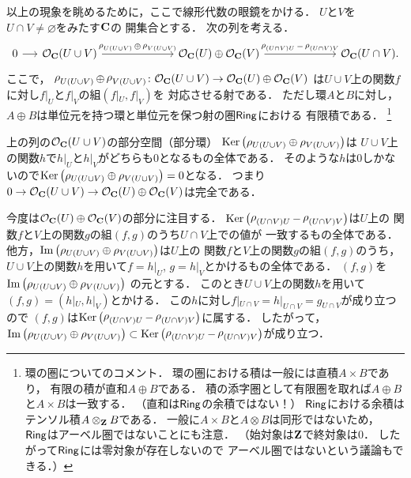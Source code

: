以上の現象を眺めるために，ここで線形代数の眼鏡をかける．
$U$と$V$を$U\cap V\neq\varnothing$をみたす$\mathbf{C}$の
開集合とする．
次の列を考える．
\begin{equation}\label{eq:hol-seq}
    \begin{tikzcd}%
        0 
        \arrow[r] 
        &[-0.03\linewidth]
        \OO_{\cc}(U\cup V)
        \arrow[r,"\res_{U(U\cup V)}\oplus\res_{V(U\cup V)}"]
        &[0.12\linewidth]
        \OO_{\cc}(U)\oplus\OO_{\cc}(V)
        \arrow[r, "\res_{(U\cap V)U}-\res_{(U\cap V)V}"] 
        &[0.12\linewidth]
        \OO_{\cc}(U\cap V).
    \end{tikzcd}
\end{equation}
ここで，
$\mathop{\rho}\nolimits_{U(U\cup V)}\oplus\mathop{\rho}\nolimits_{V(U\cup V)}\colon\mathcal{O}_{\mathbf{C}}(U\cup V)\to\mathcal{O}_{\mathbf{C}}(U)\oplus\mathcal{O}_{\mathbf{C}}(V)$
は$U\cup V$上の関数$f$に対し$f|_U$と$f|_V$の組$(f|_U,f|_V)$を
対応させる射である．
ただし環$A$と$B$に対し，
$A\oplus B$は単位元を持つ環と単位元を保つ射の圏$\mathop{\textsf{Ring}}\nolimits$における
有限積である．
\footnote{環の圏についてのコメント．
環の圏における積は一般には直積$A\times B$であり，
有限の積が直和$A\oplus B$である．
積の添字圏として有限圏を取れば$A\oplus B$と$A\times B$は一致する．
（直和は$\mathop{\textsf{Ring}}\nolimits$の余積ではない！）
$\mathop{\textsf{Ring}}\nolimits$における余積はテンソル積$A\otimes_{\mathbf{Z}} B$である．
一般に$A\times B$と$A\otimes B$は同形ではないため，
$\mathop{\textsf{Ring}}\nolimits$はアーベル圏ではないことにも注意．
（始対象は$\mathbf{Z}$で終対象は$0$．
したがって$\mathop{\textsf{Ring}}\nolimits$には零対象が存在しないので
アーベル圏ではないという議論もできる．）
}

上の列の$\mathcal{O}_{\mathbf{C}}(U\cup V)$の部分空間（部分環）
$\mathop{\mathrm{Ker}}\nolimits \left(\rho_{U(U\cup V)}\oplus\rho_{V(U\cup V)}\right)$は
$U\cup V$上の関数$h$で$h|_U$と$h|_V$がどちらも$0$となるもの全体である．
そのような$h$は$0$しかないので$\mathop{\mathrm{Ker}}\nolimits\left(\rho_{U(U\cup V)}\oplus\rho_{V(U\cup V)}\right)=0$となる．
つまり$0\to\mathcal{O}_{\mathbf{C}}(U\cup V)\to\mathcal{O}_{\mathbf{C}}(U)\oplus\mathcal{O}_{\mathbf{C}}(V)$は完全である．

今度は$\mathcal{O}_{\mathbf{C}}(U)\oplus\mathcal{O}_{\mathbf{C}}(V)$の部分に注目する．
$\mathop{\mathrm{Ker}}\nolimits\left(\mathop{\rho}\nolimits_{(U\cap V)U}-\mathop{\rho}\nolimits_{(U\cap V)V}\right)$は$U$上の
関数$f$と$V$上の関数$g$の組$(f,g)$のうち$U\cap V$上での値が
一致するもの全体である．
他方，$\mathop{\mathrm{Im}}\nolimits\left(\rho_{U(U\cup V)}\oplus\rho_{V(U\cup V)}\right)$は$U$上の
関数$f$と$V$上の関数$g$の組$(f,g)$のうち，
$U\cup V$上の関数$h$を用いて$f=h|_U$, $g=h|_V$とかけるもの全体である．
$(f,g)$を
$\mathop{\mathrm{Im}}\nolimits\left(\rho_{U(U\cup V)}\oplus\rho_{V(U\cup V)}\right)$
の元とする．
このとき$U\cup V$上の関数$h$を用いて
$(f,g)=(h|_U,h|_V)$とかける．
この$h$に対し$f|_{U\cap V}=h|_{U\cap V}=g_{U\cap V}$が成り立つので
$(f,g)$は$\mathop{\mathrm{Ker}}\nolimits\left(\mathop{\rho}\nolimits_{(U\cap V)U}-\mathop{\rho}\nolimits_{(U\cap V)V}\right)$に属する．
したがって，
$\mathop{\mathrm{Im}}\nolimits\left(\rho_{U(U\cup V)}\oplus\rho_{V(U\cup V)}\right)\subset\mathop{\mathrm{Ker}}\nolimits\left(\mathop{\rho}\nolimits_{(U\cap V)U}-\mathop{\rho}\nolimits_{(U\cap V)V}\right)$が成り立つ．

